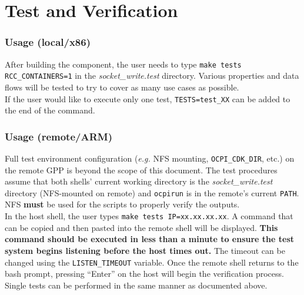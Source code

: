 \documentclass{article}
\begin{document}
\section*{Test and Verification}

\subsubsection*{Usage (local/x86)}
After building the component, the user needs to type \verb+make tests RCC_CONTAINERS=1+ in the \textit{socket\_write.test} directory. Various properties and data flows will be tested to try to cover as many use cases as possible. \\

If the user would like to execute only one test, \verb+TESTS=test_XX+ can be added to the end of the command.

\subsubsection*{Usage (remote/ARM)}
Full test environment configuration (\textit{e.g.} NFS mounting, \verb+OCPI_CDK_DIR+, etc.) on the remote GPP is beyond the scope of this document. The test procedures assume that both shells' current working directory is the \textit{socket\_write.test} directory (NFS-mounted on remote) and \verb+ocpirun+ is in the remote's current \verb+PATH+. NFS \textbf{must} be used for the scripts to properly verify the outputs. \\

In the host shell, the user types \verb+make tests IP=xx.xx.xx.xx+. A command that can be copied and then pasted into the remote shell will be displayed. \textbf{This command should be executed in less than a minute to ensure the test system begins listening before the host times out.} The timeout can be changed using the \verb+LISTEN_TIMEOUT+ variable. Once the remote shell returns to the bash prompt, pressing ``Enter'' on the host will begin the verification process. \\

Single tests can be performed in the same manner as documented above.
\end{document}
